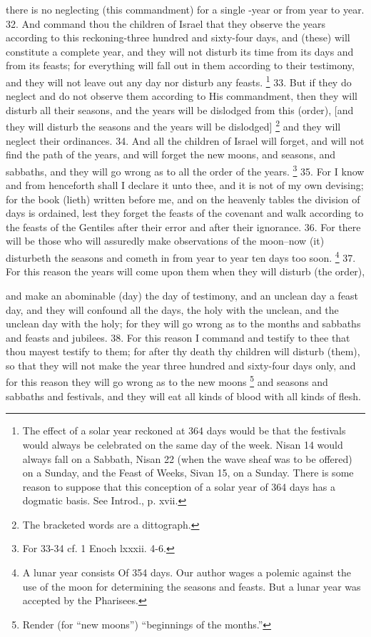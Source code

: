 there is no neglecting (this commandment) for a single -year or from year to year. 32. And command thou the children of Israel that they observe the years according to this reckoning-three hundred and sixty-four days, and (these) will constitute a complete year, and they will not disturb its time from its days and from its feasts; for everything will fall out in them according to their testimony, and they will not leave out any day nor disturb any feasts. \footnote{The effect of a solar year reckoned at 364 days would be that the festivals would always be celebrated on the same day of the week. Nisan 14 would always fall on a Sabbath, Nisan 22 (when the wave sheaf was to be offered) on a Sunday, and the Feast of Weeks, Sivan 15, on a Sunday. There is some reason to suppose that this conception of a solar year of 364 days has a dogmatic basis. See Introd., p. xvii.} 33. But if they do neglect and do not observe them according to His commandment, then they will disturb all their seasons, and the years will be dislodged from this (order), [and they will disturb the seasons and the years will be dislodged] \footnote{The bracketed words are a dittograph.} and they will neglect their ordinances. 34. And all the children of Israel will forget, and will not find the path of the years, and will forget the new moons, and seasons, and sabbaths, and they will go wrong as to all the order of the years. \footnote{For 33-34 cf. 1 Enoch lxxxii. 4-6.} 35. For I know and from henceforth shall I declare it unto thee, and it is not of my own devising; for the book (lieth) written before me, and on the heavenly tables the division of days is ordained, lest they forget the feasts of the covenant and walk according to the feasts of the Gentiles after their error and after their ignorance. 36. For there will be those who will assuredly make observations of the moon--now (it) disturbeth the seasons and cometh in from year to year ten days too soon. \footnote{A lunar year consists Of 354 days. Our author wages a polemic against the use of the moon for determining the seasons and feasts. But a lunar year was accepted by the Pharisees.} 37. For this reason the years will come upon them when they will disturb (the order),

and make an abominable (day) the day of testimony, and an unclean day a feast day, and they will confound all the days, the holy with the unclean, and the unclean day with the holy; for they will go wrong as to the months and sabbaths and feasts and jubilees. 38. For this reason I command and testify to thee that thou mayest testify to them; for after thy death thy children will disturb (them), so that they will not make the year three hundred and sixty-four days only, and for this reason they will go wrong as to the new moons \footnote{Render (for ``new moons'') ``beginnings of the months.''} and seasons and sabbaths and festivals, and they will eat all kinds of blood with all kinds of flesh.

